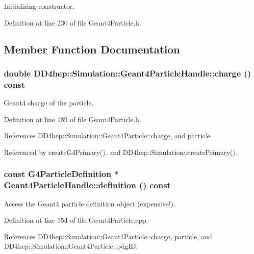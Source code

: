 Initializing constructor. 

Definition at line 230 of file Geant4Particle.h.

\subsection{Member Function Documentation}
\hypertarget{class_d_d4hep_1_1_simulation_1_1_geant4_particle_handle_a018804e5c0cda1d31a032aedb900c960}{
\subsubsection[{charge}]{\setlength{\rightskip}{0pt plus 5cm}double DD4hep::Simulation::Geant4ParticleHandle::charge () const}}
\label{class_d_d4hep_1_1_simulation_1_1_geant4_particle_handle_a018804e5c0cda1d31a032aedb900c960}


Geant4 charge of the particle. 

Definition at line 189 of file Geant4Particle.h.

References DD4hep::Simulation::Geant4Particle::charge, and particle.

Referenced by createG4Primary(), and DD4hep::Simulation::createPrimary().\hypertarget{class_d_d4hep_1_1_simulation_1_1_geant4_particle_handle_a25bb58ad5ed2c58dddfcd0b6186dbed3}{
\subsubsection[{definition}]{\setlength{\rightskip}{0pt plus 5cm}const G4ParticleDefinition $\ast$ Geant4ParticleHandle::definition () const}}
\label{class_d_d4hep_1_1_simulation_1_1_geant4_particle_handle_a25bb58ad5ed2c58dddfcd0b6186dbed3}


Access the Geant4 particle definition object (expensive!). 

Definition at line 154 of file Geant4Particle.cpp.

References DD4hep::Simulation::Geant4Particle::charge, particle, and DD4hep::Simulation::Geant4Particle::pdgID.

